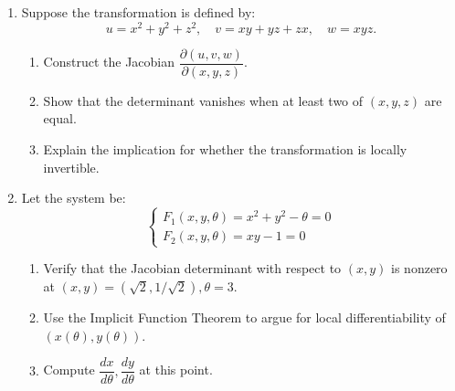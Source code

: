 \documentclass[12pt]{article}
\begin{document}
\begin{enumerate}
\item
Suppose the transformation is defined by:
\[
u = x^2 + y^2 + z^2, \quad v = xy + yz + zx, \quad w = xyz.
\]
\begin{enumerate}[label=(\alph*)]
\item Construct the Jacobian $\dfrac{\partial(u,v,w)}{\partial(x,y,z)}$.
\item Show that the determinant vanishes when at least two of $(x,y,z)$ are equal.
\item Explain the implication for whether the transformation is locally invertible.
\end{enumerate}
\newpage
\item
Let the system be:
\[
\begin{cases}
F_1(x,y,\theta) = x^2 + y^2 - \theta = 0 \\
F_2(x,y,\theta) = xy - 1 = 0
\end{cases}
\]
\begin{enumerate}[label=(\alph*)]
\item Verify that the Jacobian determinant with respect to $(x,y)$ is nonzero at $(x,y)=(\sqrt{2}, 1/\sqrt{2}), \theta=3$.
\item Use the Implicit Function Theorem to argue for local differentiability of $(x(\theta),y(\theta))$.
\item Compute $\dfrac{dx}{d\theta}, \dfrac{dy}{d\theta}$ at this point.
\end{enumerate}
\end{enumerate}
\end{document}
